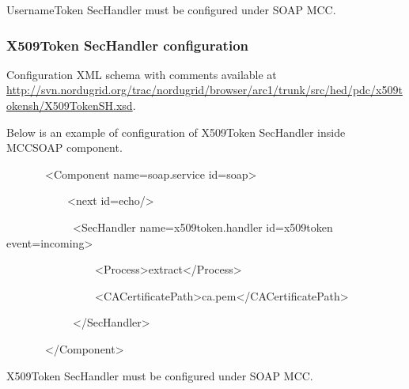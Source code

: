\documentclass{article}
\newcommand\textstyleInternetlink[1]{\textcolor[rgb]{0.0,0.0,0.5019608}{#1}}
\begin{document}
{\color{black}
UsernameToken SecHandler must be configured under SOAP MCC.}

\subsubsection[X509Token SecHandler configuration]{X509Token SecHandler
configuration}
{\upshape\color{black}
Configuration XML schema with comments available at
\href{http://svn.nordugrid.org/trac/nordugrid/browser/arc1/trunk/src/hed/pdc/usernametokensh/UsernameTokenSH.xsd}{\textstyleInternetlink{http://svn.nordugrid.org/trac/nordugrid/browser/arc1/trunk/src/hed/pdc/x509tokensh/X509TokenSH.xsd}}.}

{\upshape\color{black}
Below is an example of configuration of X509Token SecHandler inside
MCCSOAP component.}

{\ttfamily\color{black}
\ \ \ \ \ \ \ {\textless}Component
name={\textquotedbl}soap.service{\textquotedbl}
id={\textquotedbl}soap{\textquotedbl}{\textgreater}}

{\ttfamily\color{black}
\ \ \ \ \ \ \ \ \ \ \ {\textless}next
id={\textquotedbl}echo{\textquotedbl}/{\textgreater}}

{\ttfamily\color{black}
\ \ \ \ \ \ \ \ \ \ \ \ {\textless}SecHandler
name={\textquotedbl}x509token.handler{\textquotedbl}
id={\textquotedbl}x509token{\textquotedbl}
event={\textquotedbl}incoming{\textquotedbl}{\textgreater}}


\bigskip

{\ttfamily\color{black}
\ \ \ \ \ \ \ \ \ \ \ \ \ \ \ \ {\textless}Process{\textgreater}extract{\textless}/Process{\textgreater}}


\bigskip

{\ttfamily\color{black}
\ \ \ \ \ \ \ \ \ \ \ \ \ \ \ \ {\textless}CACertificatePath{\textgreater}ca.pem{\textless}/CACertificatePath{\textgreater}}


\bigskip

{\ttfamily\color{black}
\ \ \ \ \ \ \ \ \ \ \ \ {\textless}/SecHandler{\textgreater}}


\bigskip

{\ttfamily\color{black}
\ \ \ \ \ \ \ {\textless}/Component{\textgreater}}

{\color{black}
X509Token SecHandler must be configured under SOAP MCC.}
\end{document}
